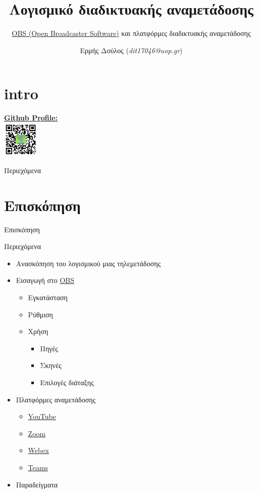 \documentclass[aspectratio=169]{beamer}
\title{Λογισμικό διαδικτυακής αναμετάδοσης}
\subtitle{\href{https://obsproject.com/}{OBS (Open Broadcaster Software)} και πλατφόρμες διαδικτυακής αναμετάδοσης}
\author{Ερμής Δούλος (\textit{dit17046@uop.gr})}
\begin{document}
\section{intro}
\begin{frame}
  \titlepage
  \begin{center}
    \href{https://github.com/doblador42}{\textbf{Github Profile:}}\\
    \includegraphics[width=0.13\textwidth]{images/qrcode.png}
  \end{center}
\end{frame}
\begin{frame}{Περιεχόμενα}
  \tableofcontents
\end{frame}

\section{Επισκόπηση}
\begin{frame}{Επισκόπηση}
  \begin{block}{Περιεχόμενα}
    \begin{itemize}
      \item Ανασκόπηση του λογισμικού μιας τηλεμετάδοσης
      \item Εισαγωγή στο \href{https://obsproject.com/}{OBS}
            \begin{itemize}
              \item Εγκατάσταση
              \item Ρύθμιση
              \item Χρήση
                    \begin{itemize}
                      \item Πηγές
                      \item Σκηνές
                      \item Επιλογές διάταξης
                    \end{itemize}
            \end{itemize}
      \item Πλατφόρμες αναμετάδοσης
            \begin{itemize}
              \item \href{https://www.youtube.com/}{YouTube}
              \item \href{https://zoom.us/}{Zoom}
              \item \href{https://www.webex.com/}{Webex}
              \item \href{https://www.microsoft.com/el-gr/microsoft-teams/group-chat-software}{Teams}
            \end{itemize}
      \item Παραδείγματα
    \end{itemize}
  \end{block}
\end{frame}
\end{document}

